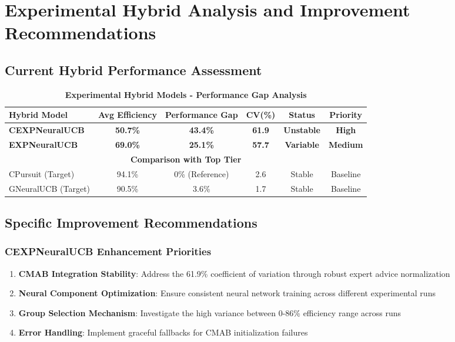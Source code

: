 \documentclass[12pt,a4paper]{article}
\newcommand{\critical}[1]{\textcolor{criticalcolor}{\textbf{#1}}}
\begin{document}
\section{Experimental Hybrid Analysis and Improvement Recommendations}

\subsection{Current Hybrid Performance Assessment}

\begin{table}[H]
\centering
\caption{\critical{Experimental Hybrid Models - Performance Gap Analysis}}
\begin{tabular}{|l|c|c|c|c|c|}
\hline
\textbf{Hybrid Model} & \textbf{Avg Efficiency} & \textbf{Performance Gap} & \textbf{CV(\%)} & \textbf{Status} & \textbf{Priority} \\
\hline
\hline
\critical{CEXPNeuralUCB} & \critical{50.7\%} & \critical{43.4\%} & \critical{61.9} & \critical{Unstable} & \critical{High} \\
\critical{EXPNeuralUCB} & \critical{69.0\%} & \critical{25.1\%} & \critical{57.7} & \critical{Variable} & \critical{Medium} \\
\hline
\multicolumn{6}{|c|}{\textbf{Comparison with Top Tier}} \\
\hline
CPursuit (Target) & 94.1\% & 0\% (Reference) & 2.6 & Stable & Baseline \\
GNeuralUCB (Target) & 90.5\% & 3.6\% & 1.7 & Stable & Baseline \\
\hline
\end{tabular}
\end{table}

\subsection{Specific Improvement Recommendations}

\subsubsection{CEXPNeuralUCB Enhancement Priorities}

\begin{enumerate}
\item \textbf{CMAB Integration Stability}: Address the 61.9\% coefficient of variation through robust expert advice normalization
\item \textbf{Neural Component Optimization}: Ensure consistent neural network training across different experimental runs
\item \textbf{Group Selection Mechanism}: Investigate the high variance between 0-86\% efficiency range across runs
\item \textbf{Error Handling}: Implement graceful fallbacks for CMAB initialization failures
\end{enumerate}
\end{document}
